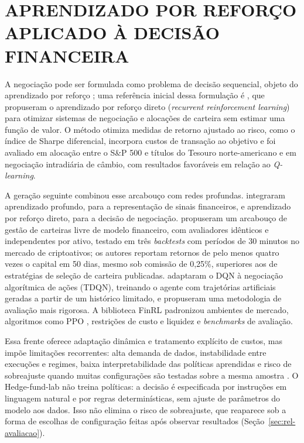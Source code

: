 \section{APRENDIZADO POR REFORÇO APLICADO À DECISÃO FINANCEIRA}

A negociação pode ser formulada como problema de decisão sequencial, objeto do aprendizado por reforço \citep{SuttonBarto2018}; uma referência inicial dessa formulação é \citet{Moody2001}, que propuseram o aprendizado por reforço direto (\textit{recurrent reinforcement learning}) para otimizar sistemas de negociação e alocações de carteira sem estimar uma função de valor. O método otimiza medidas de retorno ajustado ao risco, como o índice de Sharpe diferencial, incorpora custos de transação ao objetivo e foi avaliado em alocação entre o S\&P 500 e títulos do Tesouro norte-americano e em negociação intradiária de câmbio, com resultados favoráveis em relação ao \textit{Q-learning}.

A geração seguinte combinou esse arcabouço com redes profundas. \citet{Deng2017} integraram aprendizado profundo, para a representação de sinais financeiros, e aprendizado por reforço direto, para a decisão de negociação. \citet{Jiang2017} propuseram um arcabouço de gestão de carteiras livre de modelo financeiro, com avaliadores idênticos e independentes por ativo, testado em três \textit{backtests} com períodos de 30 minutos no mercado de criptoativos; os autores reportam retornos de pelo menos quatro vezes o capital em 50 dias, mesmo sob comissão de 0,25\%, superiores aos de estratégias de seleção de carteira publicadas. \citet{Theate2021} adaptaram o DQN à negociação algorítmica de ações (TDQN), treinando o agente com trajetórias artificiais geradas a partir de um histórico limitado, e propuseram uma metodologia de avaliação mais rigorosa. A biblioteca FinRL \citep{FinRL2020} padronizou ambientes de mercado, algoritmos como PPO \citep{Schulman2017}, restrições de custo e liquidez e \textit{benchmarks} de avaliação.

Essa frente oferece adaptação dinâmica e tratamento explícito de custos, mas impõe limitações recorrentes: alta demanda de dados, instabilidade entre execuções e regimes, baixa interpretabilidade das políticas aprendidas e risco de sobreajuste quando muitas configurações são testadas sobre a mesma amostra \citep{Bailey2017}. O Hedge-fund-lab não treina políticas: a decisão é especificada por instruções em linguagem natural e por regras determinísticas, sem ajuste de parâmetros do modelo aos dados. Isso não elimina o risco de sobreajuste, que reaparece sob a forma de escolhas de configuração feitas após observar resultados (Seção~\ref{sec:rel-avaliacao}).

